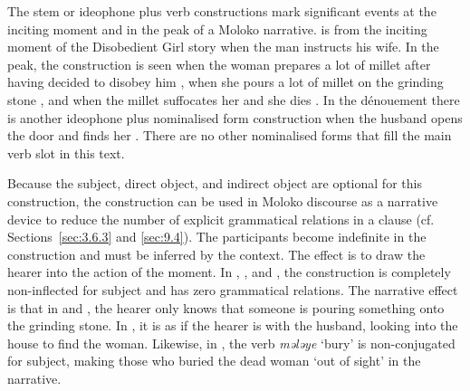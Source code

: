 The stem or ideophone plus verb constructions mark significant events at the inciting moment and in the peak of a Moloko narrative.  is from the inciting moment of the Disobedient Girl story when the man instructs his wife. In the peak, the construction is seen when the woman prepares a lot of millet after having decided to disobey him , when she pours a lot of millet on the grinding stone , and when the millet suffocates her and she dies . In the dénouement there is another ideophone plus nominalised form construction when the husband opens the door and finds her . There are no other nominalised forms that fill the main verb slot in this text. 

Because the subject, direct object, and indirect object are optional for this construction, the construction can be used in Moloko discourse as a narrative device to reduce the number of explicit grammatical relations in a clause (cf. Sections~\ref{sec:3.6.3} and \ref{sec:9.4}). The participants become indefinite in the construction and must be inferred by the context. The effect is to draw the hearer into the action of the moment. In , , and , the construction is completely non-inflected for subject and has zero grammatical relations. The narrative effect is that in  and , the hearer only knows that someone is pouring something onto the grinding stone. In  , it is as if the hearer is with the husband, looking into the house to find the woman. Likewise, in , the verb \textit{mələye }‘bury’ is non-conjugated for subject, making those who buried the dead woman ‘out of sight’ in the narrative. 
